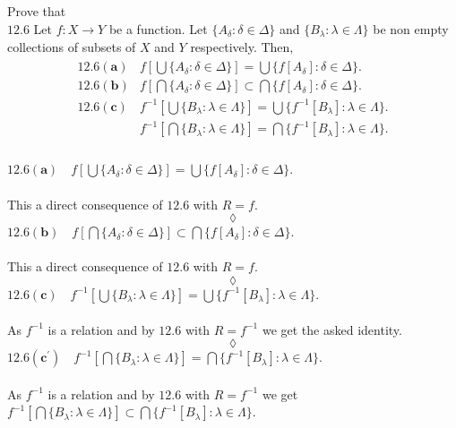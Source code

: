 \subsection{}
\begin{tcolorbox}
Prove that \\
$\mathbf{12.6}$ Let $f:X\rightarrow Y$ be a function. Let $\{A_{\delta}:\delta\in \Delta\}$ and $\{B_{\lambda}:\lambda\in \Lambda\}$ be non empty collections of subsets of $X$ and $Y$ respectively. Then,\\  
\begin{align*}
\begin{array}{ll}
\mathbf{12.6(a)}&f\left[\bigcup\{A_{\delta}:\delta \in \Delta\}\right]= \bigcup\{f[A_{\delta}]:\delta \in \Delta\}. \\
\mathbf{12.6(b)}&f\left[\bigcap\{A_{\delta}:\delta \in \Delta\}\right]\subset \bigcap\{f[A_{\delta}]:\delta \in \Delta\}. \\
\mathbf{12.6(c)}&f^{-1}\left[\bigcup\{B_{\lambda}:\lambda \in \Lambda\}\right]= \bigcup\{f^{-1}[B_{\lambda}]:\lambda \in \Lambda\}. \\
&f^{-1}\left[\bigcap\{B_{\lambda}:\lambda \in \Lambda\}\right]= \bigcap\{f^{-1}[B_{\lambda}]:\lambda \in \Lambda\}. \\
\end{array}
\end{align*}
\end{tcolorbox}
$\mathbf{12.6(a)}\quad f\left[\bigcup\{A_{\delta}:\delta \in \Delta\}\right]= \bigcup\{f[A_{\delta}]:\delta \in \Delta\}$. \\\\
This a direct consequence of $\mathbf{12.6}$  with $R=f$.
$$\lozenge$$
$\mathbf{12.6(b)}\quad f\left[\bigcap\{A_{\delta}:\delta \in \Delta\}\right]\subset \bigcap\{f[A_{\delta}]:\delta \in \Delta\}$.\\\\
This a direct consequence of $\mathbf{12.6}$  with $R=f$.
$$\lozenge$$
$\mathbf{12.6(c)}\quad f^{-1}\left[\bigcup\{B_{\lambda}:\lambda \in \Lambda\}\right]= \bigcup\{f^{-1}[B_{\lambda}]:\lambda \in \Lambda\}$. \\\\
As $f^{-1}$ is a relation and by $\mathbf{12.6}$  with $R=f^{-1}$ we get the asked identity.
$$\lozenge$$
$\mathbf{12.6(c^{'})}\quad f^{-1}\left[\bigcap\{B_{\lambda}:\lambda \in \Lambda\}\right]= \bigcap\{f^{-1}[B_{\lambda}]:\lambda \in \Lambda\}$. \\\\
As $f^{-1}$ is a relation and by $\mathbf{12.6}$  with $R=f^{-1}$ we get $f^{-1}\left[\bigcap\{B_{\lambda}:\lambda \in \Lambda\}\right]\subset \bigcap\{f^{-1}[B_{\lambda}]:\lambda \in \Lambda\}$.\\
